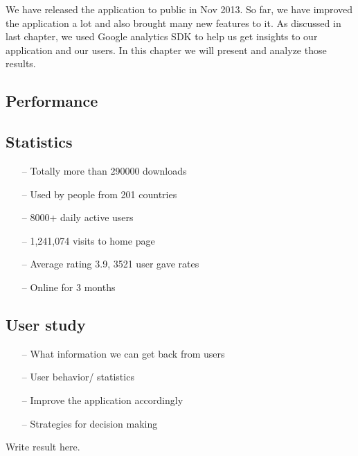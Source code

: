 
We have released the application to public in Nov 2013. So far, we have improved
the application a lot and also brought many new features to it. As discussed in
last chapter, we used Google analytics SDK to help us get insights to our
application and our users. In this chapter we will present and analyze those
results.
\subsection{Performance}

\subsection{Statistics}
\begin{itemize}
\item[--]Totally more than 290000 downloads
\item[--]Used by people from 201 countries
\item[--]8000+ daily active users
\item[--]1,241,074 visits to home page
\item[--]Average rating 3.9, 3521 user gave rates
\item[--]Online for 3 months
\end{itemize}

\subsection{User study}
\begin{itemize}
\item[--]What information we can get back from users
\item[--]User behavior/ statistics
\item[--]Improve the application accordingly
\item[--]Strategies for decision making
\end{itemize}
Write result here.